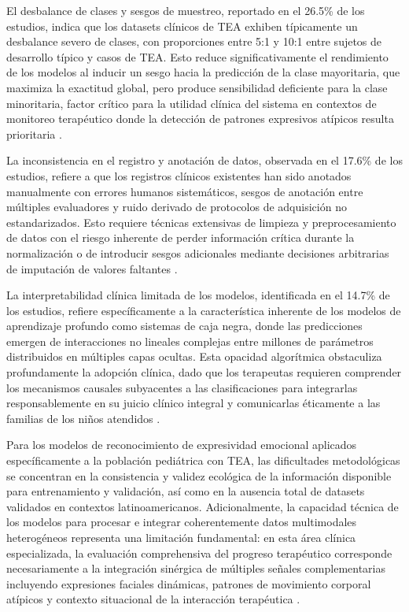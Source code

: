 \documentclass[ASNA,twocolumn]{USG}
\begin{document}
	El desbalance de clases y sesgos de muestreo, reportado en el 26.5\% de los
	estudios, indica que los datasets clínicos de TEA exhiben típicamente un desbalance
	severo de clases, con proporciones entre 5:1 y 10:1 entre sujetos de desarrollo
	típico y casos de TEA. Esto reduce significativamente el rendimiento de los modelos
	al inducir un sesgo hacia la predicción de la clase mayoritaria, que maximiza la
	exactitud global, pero produce sensibilidad deficiente para la clase minoritaria,
	factor crítico para la utilidad clínica del sistema en contextos de monitoreo
	terapéutico donde la detección de patrones expresivos atípicos resulta prioritaria
	\cite{Alam2025,Hosney2024}.
	
	La inconsistencia en el registro y anotación de datos, observada en el 17.6\% de
	los estudios, refiere a que los registros clínicos existentes han sido anotados
	manualmente con errores humanos sistemáticos, sesgos de anotación entre múltiples
	evaluadores y ruido derivado de protocolos de adquisición no estandarizados. Esto
	requiere técnicas extensivas de limpieza y preprocesamiento de datos con el riesgo
	inherente de perder información crítica durante la normalización o de introducir
	sesgos adicionales mediante decisiones arbitrarias de imputación de valores
	faltantes \cite{Sariyanidi2025,Dapogny2019}.
	
	La interpretabilidad clínica limitada de los modelos, identificada en el 14.7\% de
	los estudios, refiere específicamente a la característica inherente de los modelos
	de aprendizaje profundo como sistemas de caja negra, donde las predicciones emergen
	de interacciones no lineales complejas entre millones de parámetros distribuidos en
	múltiples capas ocultas. Esta opacidad algorítmica obstaculiza profundamente la
	adopción clínica, dado que los terapeutas requieren comprender los mecanismos
	causales subyacentes a las clasificaciones para integrarlas responsablemente en su
	juicio clínico integral y comunicarlas éticamente a las familias de los niños
	atendidos \cite{Rhatassi2024,Radocaj2025}.
	
	Para los modelos de reconocimiento de expresividad emocional aplicados
	específicamente a la población pediátrica con TEA, las dificultades metodológicas
	se concentran en la consistencia y validez ecológica de la información disponible
	para entrenamiento y validación, así como en la ausencia total de datasets
	validados en contextos latinoamericanos. Adicionalmente, la capacidad técnica de
	los modelos para procesar e integrar coherentemente datos multimodales heterogéneos
	representa una limitación fundamental: en esta área clínica especializada, la
	evaluación comprehensiva del progreso terapéutico corresponde necesariamente a la
	integración sinérgica de múltiples señales complementarias incluyendo expresiones
	faciales dinámicas, patrones de movimiento corporal atípicos y contexto situacional
	de la interacción terapéutica \cite{Cicceri2026,Rudovic2019}.
	
\end{document}
